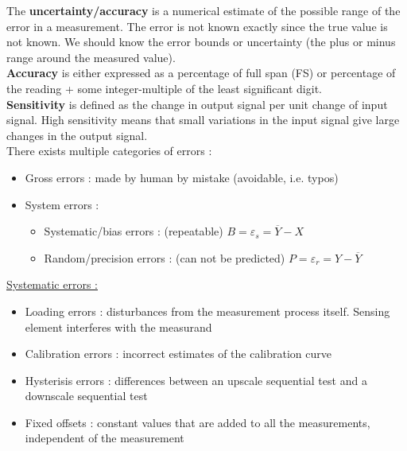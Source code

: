 \documentclass[../main.tex]{subfiles}
\begin{document}
The \textbf{uncertainty/accuracy} is a numerical estimate of the possible range of the error in a measurement. The error is not known exactly since the true value is not known. We should know the error bounds or uncertainty (the plus or minus range around the measured value).\\

\textbf{Accuracy} is either expressed as a percentage of full span (FS) or percentage of the reading + some integer-multiple of the least significant digit.\\

\textbf{Sensitivity} is defined as the change in output signal per unit change of input signal. High sensitivity means that small variations in the input signal give large changes in the output signal.\\

There exists multiple categories of errors : \\
\begin{itemize}
    \item Gross errors : made by human by mistake (avoidable, i.e. typos)\\
    \item System errors : \begin{itemize}
        \item Systematic/bias errors : (repeatable) $B = \varepsilon_s = \overline{Y}-X$\\
        \item Random/precision errors : (can not be predicted) $P = \varepsilon_r = Y-\overline{Y}$\\
    \end{itemize}
\end{itemize}

\quad \underline{Systematic errors :}\\
\begin{itemize}
    \item Loading errors : disturbances from the measurement process itself. Sensing element interferes with the measurand\\
    \item Calibration errors : incorrect estimates of the calibration curve\\
    \item Hysterisis errors : differences between an upscale sequential test and a downscale sequential test\\
    \item Fixed offsets : constant values that are added to all the measurements, independent of the measurement\\
\end{itemize}
\end{document}
